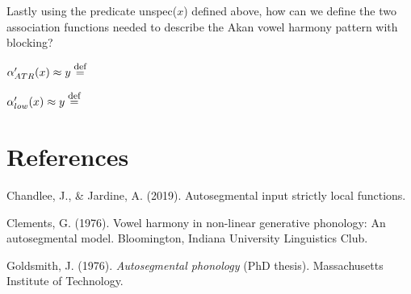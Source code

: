 \documentclass[,doc,floatsintext]{apa6}
\def\defeq{\mathrel{\buildrel \mbox{\footnotesize def} \over =}}
\theoremstyle{definition}
\theoremstyle{definition}
\theoremstyle{definition}
\theoremstyle{remark}
\begin{document}
\noindent Lastly using the predicate unspec(\(x\)) defined above, how
can we define the two association functions needed to describe the Akan
vowel harmony pattern with blocking?

\noindent \(\alpha_{ATR}'(x)\approx y \defeq\) \vspace{1in}

\noindent \(\alpha_{low}'(x)\approx y \defeq\) \vspace{2in}

\section{References}\label{references}

\begingroup
\setlength{\parindent}{-0.5in} \setlength{\leftskip}{0.5in}

\hypertarget{refs}{}
\hypertarget{ref-chandleejardineaisl}{}
Chandlee, J., \& Jardine, A. (2019). Autosegmental input strictly local
functions.

\hypertarget{ref-Clements1976}{}
Clements, G. (1976). Vowel harmony in non-linear generative phonology:
An autosegmental model. Bloomington, Indiana University Linguistics
Club.

\hypertarget{ref-Goldsmith1976}{}
Goldsmith, J. (1976). \emph{Autosegmental phonology} (PhD thesis).
Massachusetts Institute of Technology.

\endgroup
\end{document}
